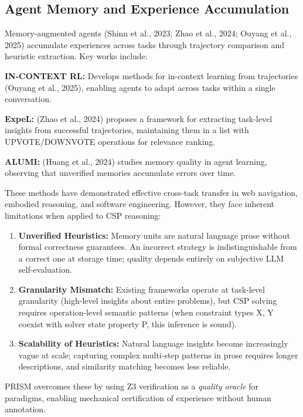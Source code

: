 \subsection{Agent Memory and Experience Accumulation}

Memory-augmented agents (Shinn et al., 2023; Zhao et al., 2024; Ouyang et al., 2025) accumulate experiences across tasks through trajectory comparison and heuristic extraction. Key works include:

\textbf{IN-CONTEXT RL:} Develops methods for in-context learning from trajectories (Ouyang et al., 2025), enabling agents to adapt across tasks within a single conversation.

\textbf{ExpeL:} (Zhao et al., 2024) proposes a framework for extracting task-level insights from successful trajectories, maintaining them in a list with UPVOTE/DOWNVOTE operations for relevance ranking.

\textbf{ALUMI:} (Huang et al., 2024) studies memory quality in agent learning, observing that unverified memories accumulate errors over time.

These methods have demonstrated effective cross-task transfer in web navigation, embodied reasoning, and software engineering. However, they face inherent limitations when applied to CSP reasoning:

\begin{enumerate}
    \item \textbf{Unverified Heuristics:} Memory units are natural language prose without formal correctness guarantees. An incorrect strategy is indistinguishable from a correct one at storage time; quality depends entirely on subjective LLM self-evaluation.

    \item \textbf{Granularity Mismatch:} Existing frameworks operate at task-level granularity (high-level insights about entire problems), but CSP solving requires operation-level semantic patterns (when constraint types X, Y coexist with solver state property P, this inference is sound).

    \item \textbf{Scalability of Heuristics:} Natural language insights become increasingly vague at scale; capturing complex multi-step patterns in prose requires longer descriptions, and similarity matching becomes less reliable.
\end{enumerate}

PRISM overcomes these by using Z3 verification as a \textit{quality oracle} for paradigms, enabling mechanical certification of experience without human annotation.

